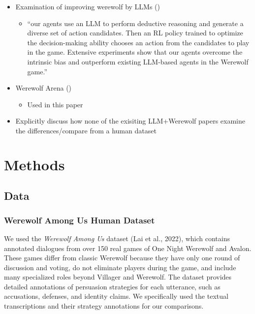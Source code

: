 \documentclass[
  letterpaper,
  DIV=11,
  numbers=noendperiod]{scrreprt}
\providecommand{\tightlist}{%
  \setlength{\itemsep}{0pt}\setlength{\parskip}{0pt}}
\begin{document}
\begin{itemize}
\tightlist
\item
  Examination of improving werewolf by LLMs
  ()

  \begin{itemize}
  \tightlist
  \item
    ``our agents use an LLM to perform deductive reasoning and generate
    a diverse set of action candidates. Then an RL policy trained to
    optimize the decision-making ability chooses an action from the
    candidates to play in the game. Extensive experiments show that our
    agents overcome the intrinsic bias and outperform existing LLM-based
    agents in the Werewolf game.''
  \end{itemize}
\item
  Werewolf Arena ()

  \begin{itemize}
  \tightlist
  \item
    Used in this paper
  \end{itemize}
\item
  Explicitly discuss how none of the exisiting LLM+Werewolf papers
  examine the differences/compare from a human dataset
\end{itemize}

\chapter{Methods}\label{methods}

\section{Data}\label{data}

\subsection{Werewolf Among Us Human
Dataset}\label{werewolf-among-us-human-dataset}

We used the \emph{Werewolf Among Us} dataset (Lai et al., 2022), which
contains annotated dialogues from over 150 real games of One Night
Werewolf and Avalon. These games differ from classic Werewolf because
they have only one round of discussion and voting, do not eliminate
players during the game, and include many specialized roles beyond
Villager and Werewolf. The dataset provides detailed annotations of
persuasion strategies for each utterance, such as accusations, defenses,
and identity claims. We specifically used the textual transcriptions and
their strategy annotations for our comparisons.
\end{document}
